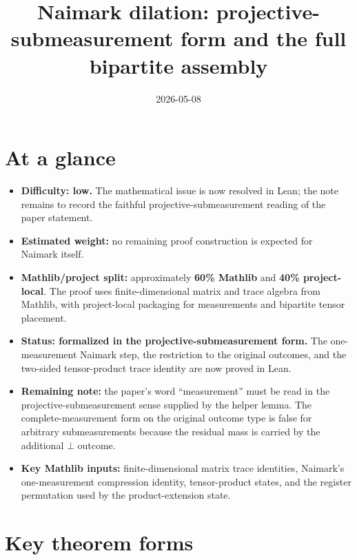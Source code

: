 \documentclass[11pt]{article}
\title{Naimark dilation: projective-submeasurement form and the full bipartite assembly}
\author{}
\date{2026-05-08}
\begin{document}
\maketitle

\section{At a glance}

\begin{itemize}
  \item \textbf{Difficulty: low.}  The mathematical issue is now resolved in
  Lean; the note remains to record the faithful projective-submeasurement
  reading of the paper statement.
  \item \textbf{Estimated weight:} no remaining proof construction is expected
  for Naimark itself.
  \item \textbf{Mathlib/project split:} approximately \textbf{60\% Mathlib} and
  \textbf{40\% project-local}.  The proof uses finite-dimensional matrix and
  trace algebra from Mathlib, with project-local packaging for measurements and
  bipartite tensor placement.
  \item \textbf{Status: formalized in the projective-submeasurement form.}  The
  one-measurement Naimark step, the restriction to the original outcomes, and
  the two-sided tensor-product trace identity are now proved in Lean.
  \item \textbf{Remaining note:} the paper's word ``measurement'' must be read
  in the projective-submeasurement sense supplied by the helper lemma.  The
  complete-measurement form on the original outcome type is false for arbitrary
  submeasurements because the residual mass is carried by the additional
  \(\bot\) outcome.
  \item \textbf{Key Mathlib inputs:} finite-dimensional matrix trace
  identities, Naimark's one-measurement compression identity, tensor-product
  states, and the register permutation used by the product-extension state.
\end{itemize}

\section{Key theorem forms}
\end{document}
